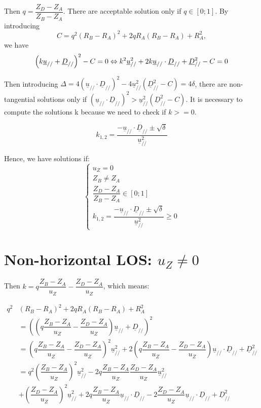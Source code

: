\documentclass[a4paper,11pt,twoside,titlepage,openright]{book}
\numberwithin{equation}{section}
\newcommand{\ud}[1]{\underline{#1}}
\begin{document}
Then $q=\dfrac{Z_D-Z_A}{Z_B-Z_A}$.
There are acceptable solution only if $q\in[0;1]$. 
By introducing $$C = q^2(R_B-R_A)^2 + 2qR_A(R_B-R_A) + R_A^2,$$ we have
$$
\left(k\ud{u}_{//} + \ud{D}_{//}\right)^2 - C = 0\\
\Leftrightarrow k^2\ud{u}_{//}^2 + 2k\ud{u}_{//}\cdot\ud{D}_{//} + \ud{D}_{//}^2-C = 0
$$

Then introducing $\Delta = 4\left(\ud{u}_{//}\cdot\ud{D}_{//}\right)^2 - 4\ud{u}_{//}^2\left(\ud{D}_{//}^2-C\right) = 4\delta$, there are non-tangential solutions only if $\left(\ud{u}_{//}\cdot\ud{D}_{//}\right)^2 >\ud{u}_{//}^2\left(\ud{D}_{//}^2-C\right)$.
It is necessary to compute the solutions k because we need to check if $k>=0$.

$$
k_{1,2} = \dfrac{-\ud{u}_{//}\cdot\ud{D}_{//} \pm \sqrt{\delta}}{\ud{u}_{//}^2}
$$

Hence, we have solutions if:
$$
\left\{
\begin{array}{lll}
u_Z = 0\\
Z_B\neq Z_A\\
\dfrac{Z_D-Z_A}{Z_B-Z_A} \in [0;1]\\
k_{1,2} = \dfrac{-\ud{u}_{//}\cdot\ud{D}_{//} \pm \sqrt{\delta}}{\ud{u}_{//}^2} \geq 0
\end{array}
\right.
$$

\section{Non-horizontal LOS: $u_Z\neq0$}

Then $k=q\dfrac{Z_B-Z_A}{u_Z} - \dfrac{Z_D-Z_A}{u_Z}$, which means:


$$
\begin{array}{lll}
q^2 & (R_B-R_A)^2 + 2qR_A(R_B-R_A) + R_A^2\\
& =\left(\left(q\dfrac{Z_B-Z_A}{u_Z} - \dfrac{Z_D-Z_A}{u_Z}\right)\ud{u}_{//} + \ud{D}_{//}\right)^2\\
& = \left(q\dfrac{Z_B-Z_A}{u_Z} - \dfrac{Z_D-Z_A}{u_Z}\right)^2\ud{u}_{//}^2 + 2\left(q\dfrac{Z_B-Z_A}{u_Z} - \dfrac{Z_D-Z_A}{u_Z}\right)\ud{u}_{//}\cdot\ud{D}_{//} + \ud{D}_{//}^2\\
& =q^2\left(\dfrac{Z_B-Z_A}{u_Z}\right)^2\ud{u}_{//}^2 - 2q\dfrac{Z_B-Z_A}{u_Z}\dfrac{Z_D-Z_A}{u_Z}\ud{u}_{//}^2 \\
& + \left(\dfrac{Z_D-Z_A}{u_Z}\right)^2\ud{u}_{//}^2
+ 2q\dfrac{Z_B-Z_A}{u_Z}\ud{u}_{//}\cdot\ud{D}_{//} - 2\dfrac{Z_D-Z_A}{u_Z}\ud{u}_{//}\cdot\ud{D}_{//} + \ud{D}_{//}^2\\ 
\end{array}
$$
\end{document}
